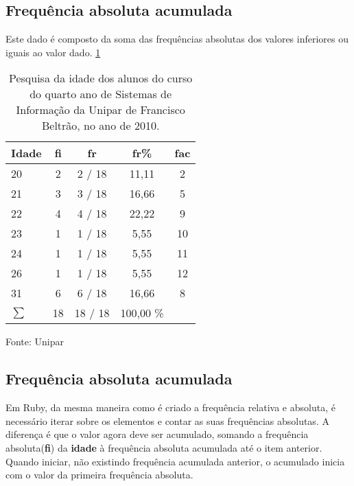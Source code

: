\documentclass[espaco=simples,appendix=Name]{abnt}
\newcommand{\code}[1] {\textbf{#1}}
\begin{document}
\subsection{ Frequência absoluta acumulada} 

Este dado é composto da soma das frequências absolutas dos valores inferiores ou iguais ao valor dado. \ref{tabela FAC percentual}

\begin{table}
\caption{Pesquisa da idade dos alunos do curso do quarto ano de Sistemas de Informação da Unipar de Francisco Beltrão, no ano de 2010.}
\label{tabela FAC percentual}
\begin{tabular}{|l|c|c|c|c|} 
\hline 

Idade &  \code{fi} & \code{fr}  & \code{fr\%} & \code{fac}\\ \hline 
20    &      2       &      2 / 18  &   11,11  &      2 \\ 
21    &      3       &      3 / 18  &   16,66  &      5 \\
22    &      4       &      4 / 18  &   22,22  &      9 \\
23    &      1       &      1 / 18  &    5,55  &     10 \\
24    &      1       &      1 / 18  &    5,55  &     11 \\
26    &      1       &      1 / 18  &    5,55  &     12 \\
31    &      6       &      6 / 18  &   16,66  &      8 \\ 
\hline 
\begin{math}
\sum 
\end{math} & 18      &     18 / 18  & 100,00 \% & \\
\hline 
\end{tabular}
\small{Fonte: Unipar}
\end{table}


\subsection{ Frequência absoluta acumulada} 

Em Ruby, da mesma maneira como é criado a frequência relativa e absoluta, é necessário iterar sobre os elementos e contar as suas frequências absolutas. A diferença é que o valor agora deve ser acumulado, somando a frequência absoluta(\code{fi}) da \code{idade } à frequência absoluta acumulada até o item anterior. Quando iniciar, não existindo frequência acumulada anterior, o acumulado inicia com o valor da primeira frequência absoluta.
\end{document}
